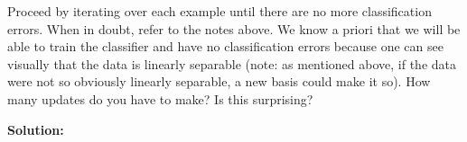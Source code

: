 \documentclass[12pt,letterpaper]{article}
\begin{document}
\begin{enumerate}
{{Proceed by iterating over each example until there are no more classification errors. When in doubt, refer to the notes above.
We know a priori that we will be able to train the classifier and have no classification errors because one can see visually
that the data is linearly separable (note: as mentioned above, if the data were not so obviously linearly separable, a new basis
could make it so). How many updates do you have to make? Is this surprising?

}}


\newpage

\textbf{Solution:}
  \end{enumerate}
\end{document}
